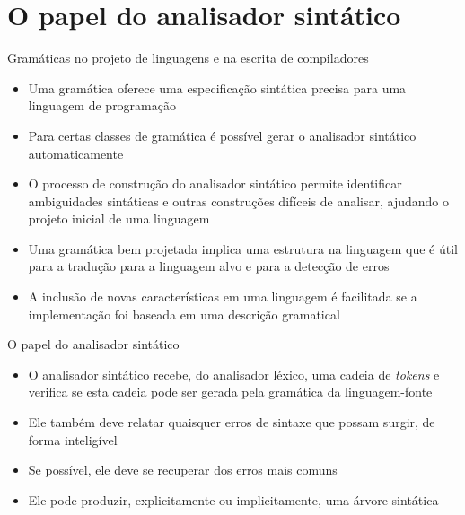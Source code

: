 \section{O papel do analisador sintático}

\begin{frame}[fragile]{Gramáticas no projeto de linguagens e na escrita de compiladores}

    \begin{itemize}
        \item Uma gramática oferece uma especificação sintática precisa para uma linguagem de programação

        \item Para certas classes de gramática é possível gerar o analisador sintático automaticamente

        \item O processo de construção do analisador sintático permite identificar ambiguidades sintáticas e outras construções difíceis de analisar, ajudando o
            projeto inicial de uma linguagem

        \item Uma gramática bem projetada implica uma estrutura na linguagem que é útil para a tradução para a linguagem alvo e para a detecção de erros

        \item A inclusão de novas características em uma linguagem é facilitada se a implementação foi baseada em uma descrição gramatical
    \end{itemize}

\end{frame}

\begin{frame}[fragile]{O papel do analisador sintático}

    \begin{itemize}
        \item O analisador sintático recebe, do analisador léxico, uma cadeia de \textit{tokens} e verifica se esta cadeia pode ser gerada pela gramática da
            linguagem-fonte

        \item Ele também deve relatar quaisquer erros de sintaxe que possam surgir, de forma inteligível

        \item Se possível, ele deve se recuperar dos erros mais comuns

        \item Ele pode produzir, explicitamente ou implicitamente, uma árvore sintática 
    \end{itemize}

\end{frame}

